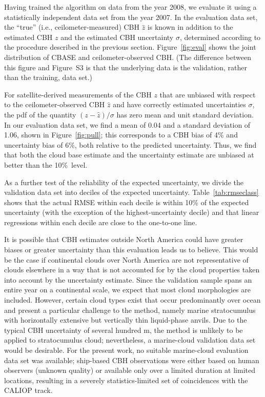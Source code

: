 \documentclass[essd,manuscript]{copernicus}\usepackage[]{graphicx}\usepackage[]{color}
\begin{document}
Having trained the algorithm on data from the year 2008, we evaluate it using a
statistically independent data set from the year 2007.  In the evaluation data
set, the ``true'' (i.e., ceilometer-measured) CBH $\hat{z}$
is known in addition to the estimated CBH $z$ and the estimated
CBH uncertainty $\sigma$, determined according to the procedure
described in the previous section.  Figure~\ref{fig:eval} shows the joint
distribution of CBASE and ceilometer-observed CBH.  (The
difference between this figure and Figure~S3 is that the underlying data is the
validation, rather than the training, data set.)

For satellite-derived measurements of the CBH $z$ that are unbiased with respect
to the ceilometer-observed CBH $\hat{z}$ and have correctly estimated
uncertainties $\sigma$, the pdf of the quantity $(z - \hat{z})/\sigma$ has zero
mean and unit standard deviation. In our evaluation data set, we find a mean of
0.04 and a standard
deviation of 1.06, shown in
Figure~\ref{fig:pull}; this corresponds to a CBH bias of %
4\% and
uncertainty bias of %
6\%,
both relative to the predicted uncertainty.  Thus, we find that both the cloud
base estimate and the uncertainty estimate are unbiased at better than the 10\%\
level.

As a further test of the reliability of the expected uncertainty, we divide the
validation data set into deciles of the expected uncertainty.
Table~\ref{tab:rmseclass} shows that the actual RMSE within each decile is
within 10\% of the expected uncertainty (with the exception of the highest-uncertainty
decile) and that linear regressions within each
decile are close to the one-to-one line.

It is possible that CBH estimates outside North America could have
greater biases or greater uncertainty than this evaluation leads us to
believe.  This would be the case if continental clouds over North America are
not representative of clouds elsewhere in a way that is not accounted for by the
cloud properties taken into account by the uncertainty estimate.  Since the
validation sample spans an entire year on a continental scale, we expect that
most cloud morphologies are included.  However, certain cloud types exist that
occur predominantly over ocean and present a particular challenge to the method,
namely marine stratocumulus with horizontally extensive but vertically thin
liquid-phase anvils.  Due to the typical CBH uncertainty of
several hundred m, the method is unlikely to be applied to stratocumulus cloud;
nevertheless, a marine-cloud validation data set would be desirable.  For the
present work, no suitable marine-cloud evaluation data set was available;
ship-based CBH observations were either based on human observers
(unknown quality) or available only over a limited duration at limited
locations, resulting in a severely statistics-limited set of coincidences with
the CALIOP track.
\end{document}

